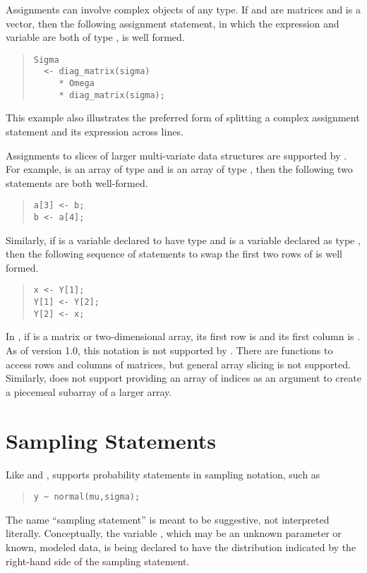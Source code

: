 Assignments can involve complex objects of any type.  If 
and  are matrices and  is a vector, then the
following assignment statement, in which the expression and variable
are both of type , is well formed.
%
\begin{quote}
\begin{Verbatim}[fontsize=\small]
Sigma
  <- diag_matrix(sigma)
     * Omega 
     * diag_matrix(sigma);
\end{Verbatim}
\end{quote}
%
This example also illustrates the preferred form of splitting a
complex assignment statement and its expression across lines.

Assignments to slices of larger multi-variate data structures are
supported by \Stan.  For example,  is an array of type
 and  is an array of type , then
the following two statements are both well-formed.
%
\begin{quote}
\begin{Verbatim}[fontsize=\small]
a[3] <- b;
b <- a[4];
\end{Verbatim}
\end{quote}
%
Similarly, if  is a variable declared to have type
 and  is a variable declared as type
, then the following sequence of statements to swap the
first two rows of  is well formed.
%
\begin{quote}
\begin{Verbatim}[fontsize=\small]
x <- Y[1];
Y[1] <- Y[2];
Y[2] <- x;
\end{Verbatim}
\end{quote}
%

In \R, if  is a matrix or two-dimensional array, its first row
is  and its first column is .  As of version
1.0, this notation is not supported by \Stan.  There are functions to
access rows and columns of matrices, but general array slicing is not
supported.  Similarly,  does not support providing an array of
indices as an argument to create a piecemeal subarray of a larger
array.


\section{Sampling Statements}

Like \BUGS and \JAGS, \Stan supports probability statements in
sampling notation, such as
%
\begin{quote}
\begin{Verbatim}[fontsize=\small]
y ~ normal(mu,sigma);
\end{Verbatim}
\end{quote}
%
The name ``sampling statement'' is meant to be suggestive, not
interpreted literally.  Conceptually, the variable , which may
be an unknown parameter or known, modeled data, is being declared
to have the distribution indicated by the right-hand side of the
sampling statement.

